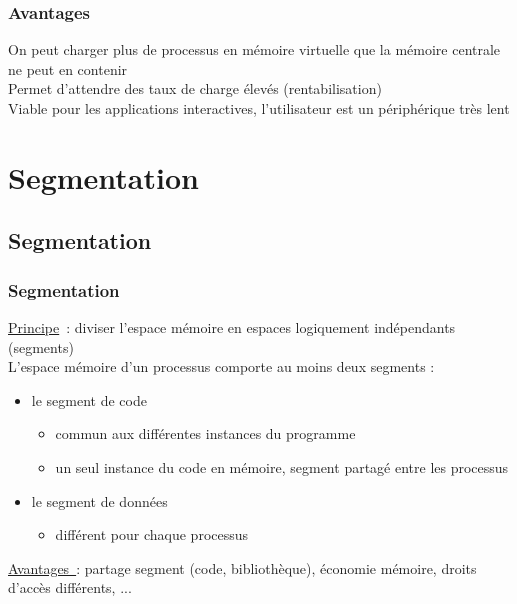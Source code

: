 \begin{frame}
\frametitle{Avantages}
On peut charger plus de processus en \alert{mémoire virtuelle} que la mémoire
centrale ne peut en contenir\\ 
\vspace{0.5cm}
Permet d'attendre des taux de charge élevés (rentabilisation)\\
\vspace{0.5cm}
Viable pour les applications interactives,
l'utilisateur est un périphérique très lent\\
\end{frame}


\section{Segmentation}
\subsection*{Segmentation}

\begin{frame}
  \frametitle{Segmentation}
\underline{Principe}~: diviser l'espace mémoire en espaces logiquement indépendants (segments)\\  
\vspace{0.3cm}
L'espace mémoire d'un processus comporte au moins deux \alert{segments} :
\begin{itemize}
\item le segment de \alert{code}
\begin{itemize}
\item commun aux différentes instances du programme 
\item un seul instance du code en mémoire, segment \alert{partagé} entre les processus
\end{itemize}
\item le segment de \alert{données}
  \begin{itemize}
  \item différent pour chaque processus
  \end{itemize}
\end{itemize}
\vspace{0.3cm}
\underline{Avantages~}: partage segment (code, bibliothèque), économie mémoire, droits d'accès différents, ...\\
\end{frame}

